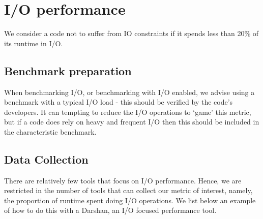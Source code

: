 \section{I/O performance}
\label{section:high-level:io}

\begin{summary}
 We consider a code not to suffer from IO constraints if it spends less than 20\% of its runtime in I/O.
\end{summary}

\subsection{Benchmark preparation}


When benchmarking I/O, or benchmarking with I/O enabled, we advise using a benchmark with a typical I/O load - this should be verified by the code's developers. It can tempting to reduce the I/O operations to `game' this metric, but if a code does rely on heavy and frequent I/O then this should be included in the characteristic benchmark.

\subsection{Data Collection}

There are relatively few tools that focus on I/O performance. Hence, we are restricted in the number of tools that can collect our metric of interest, namely, the proportion of runtime spent doing I/O operations. We list below an example of how to do this with a Darshan, an I/O focused performance tool.

